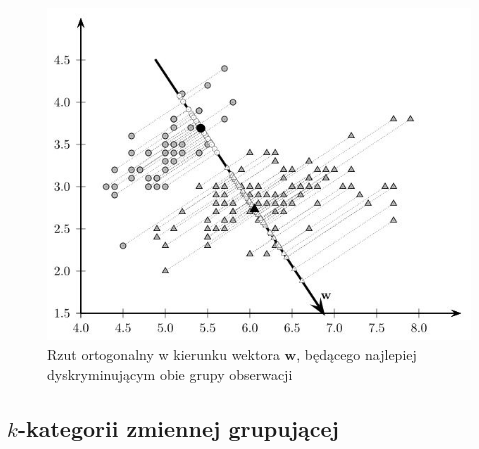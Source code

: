 \documentclass[
]{book}
\theoremstyle{plain}
\theoremstyle{definition}
\theoremstyle{definition}
\theoremstyle{definition}
\theoremstyle{definition}
\theoremstyle{definition}
\theoremstyle{remark}
\begin{document}
\begin{figure}

{\centering \includegraphics[width=6.02in]{images/rzut2} 

}

\caption{Rzut ortogonalny w kierunku wektora $\boldsymbol{w}$, będącego najlepiej dyskryminującym obie grupy obserwacji}\label{fig:rzut2}
\end{figure}

\subsection{\texorpdfstring{\(k\)-kategorii zmiennej grupującej}{k-kategorii zmiennej grupującej}}\label{k-kategorii-zmiennej-grupujux105cej}
\end{document}
